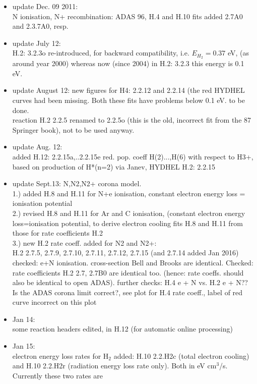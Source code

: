 \documentclass[12pt,dvipdfmx]{article}
\begin{document}
\begin{itemize}
  \item update Dec. 09 2011: \\
   N ionisation, N+ recombination: ADAS 96, H.4 and H.10 fits added 2.7A0 and 2.3.7A0, resp.
  \item update July 12:  \\
  H.2: 3.2.3o re-introduced, for backward compatibility, i.e. $E_{H_2}=0.37$ eV, (as around year 2000)
  whereas now (since 2004) in  H.2: 3.2.3 this energy is 0.1 eV.
  \item update August 12: new figures for H4: 2.2.12 and 2.2.14 (the red
  HYDHEL curves had been missing. Both these fits have problems below 0.1 eV. to be done.\\
  reaction H.2 2.2.5 renamed to 2.2.5o (this is the old, incorrect fit from the 87 Springer book),
  not to be used anyway.
  \item update Aug. 12: \\
  added H.12: 2.2.15a,..2.2.15e red. pop. coeff H(2)...,H(6) with respect to H3+,
  based on production of H*(n=2) via Janev, HYDHEL H.2: 2.2.15
  \item update Sept.13: N,N2,N2+ corona model. \\
  1.) added H.8 and H.11 for N+e ionisation, constant electron energy loss = ionisation potential\\
  2.) revised H.8 and H.11 for Ar and C ionisation, (constant electron energy loss=ionisation potential,
  to derive electron cooling fits H.8 and H.11 from those for rate coefficients H.2\\
  3.) new H.2 rate coeff. added for N2 and N2+:        \\
  H.2 2.7.5, 2.7.9, 2.7.10, 2.7.11, 2.7.12, 2.7.15  (and 2.7.14 added Jan 2016)
  \\
  checked: e+N ionisation. cross-section Bell and Brooks are identical.
  Checked: rate coefficients H.2  2.7, 2.7B0 are identical too.
  (hence: rate coeffs. should also be identical to open ADAS).
  further checks:
  H.4 e + N vs. H.2 e + N?? Is the ADAS corona limit correct?, see plot for H.4 rate coeff.,
  label of red curve incorrect on this plot
  \item Jan 14:\\
  some reaction headers edited, in H.12 (for automatic online processing)
  \item Jan 15:\\
  electron energy loss rates for H$_2$ added: H.10  2.2.H2c (total electron cooling)
  and H.10 2.2.H2r  (radiation energy loss rate only). Both in eV cm$^3$/s. Currently these two rates are

\end{itemize}
\end{document}
